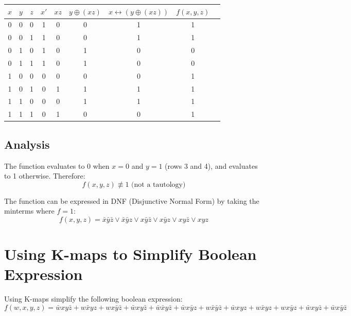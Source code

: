 \documentclass[11pt]{article}
\begin{document}
\begin{center}
\begin{tabular}{|c|c|c|c|c|c|c|c|c|}
\hline
$x$ & $y$ & $z$ & $x'$ & $xz$ & $y \oplus (xz)$ & $x \leftrightarrow (y \oplus (xz))$ & $f(x,y,z)$ \\
\hline
0 & 0 & 0 & 1 & 0 & 0 & 1 & 1 \\
0 & 0 & 1 & 1 & 0 & 0 & 1 & 1 \\
0 & 1 & 0 & 1 & 0 & 1 & 0 & 0 \\
0 & 1 & 1 & 1 & 0 & 1 & 0 & 0 \\
1 & 0 & 0 & 0 & 0 & 0 & 0 & 1 \\
1 & 0 & 1 & 0 & 1 & 1 & 1 & 1 \\
1 & 1 & 0 & 0 & 0 & 1 & 1 & 1 \\
1 & 1 & 1 & 0 & 1 & 0 & 0 & 1 \\
\hline
\end{tabular}
\end{center}
\subsection{Analysis}
\label{sec:org66b0a32}
The function evaluates to 0 when \(x=0\) and \(y=1\) (rows 3 and 4), and evaluates to 1 otherwise. Therefore:
\[
\boxed{f(x, y, z) \not\equiv 1 \text{ (not a tautology)}}
\]

The function can be expressed in DNF (Disjunctive Normal Form) by taking the minterms where \(f=1\):
\[
f(x,y,z) = \bar{x}\bar{y}\bar{z} \lor \bar{x}\bar{y}z \lor x\bar{y}\bar{z} \lor x\bar{y}z \lor xy\bar{z} \lor xyz
\]

\newpage
\section{Using K-maps to Simplify Boolean Expression}
\label{sec:org29ac3c0}
Using K-maps simplify the following boolean expression:
\[
f(w, x, y, z)= \bar{w}xy\bar{z}+w\bar{x}yz +wx\bar{y}\bar{z}+\bar{w}xy\bar{z}+\bar{w}\bar{x}y\bar{z}+\bar{w}x\bar{y}z+w\bar{x}\bar{y}\bar{z}+\bar{w}xyz+w\bar{x}yz+wx\bar{y}z+\bar{w}xy\bar{z}+\bar{w}x\bar{y}\bar{z}
\]
\end{document}
